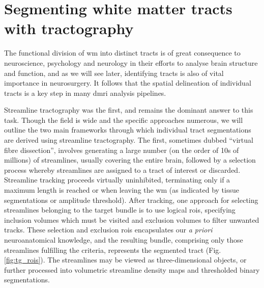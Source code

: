 \section{Segmenting white matter tracts with tractography}

The functional division of \gls{wm} into distinct tracts is of great consequence to neuroscience, psychology and neurology in their efforts to analyse brain structure and function, and as we will see later, identifying tracts is also of vital importance in neurosurgery.
It follows that the spatial delineation of individual tracts is a key step in many \gls{dmri} analysis pipelines.

Streamline tractography was the first, and remains the dominant answer to this task.
Though the field is wide and the specific approaches numerous, we will outline the two main frameworks through which individual tract segmentations are derived using streamline tractography.
The first, sometimes dubbed ``virtual fibre dissection'', involves generating a large number (on the order of 10s of millions) of streamlines, usually covering the entire brain, followed by a selection process whereby streamlines are assigned to a tract of interest or discarded.
Streamline tracking proceeds virtually uninhibited, terminating only if a maximum length is reached or when leaving the \gls{wm} (as indicated by tissue segmentations\autocite{Smith2012} or  amplitude threshold).
After tracking, one approach for selecting streamlines belonging to the target bundle is to use logical \glspl{roi}, specifying inclusion volumes which must be visited and exclusion volumes to filter unwanted tracks.
These selection and exclusion \glspl{roi} encapsulates our \textit{a priori} neuroanatomical knowledge, and the resulting bundle, comprising only those streamlines fulfilling the criteria, represents the segmented tract (Fig. \ref{fig:tg_rois}).
The streamlines may be viewed as three-dimensional objects, or further processed into volumetric streamline density maps\autocite{Calamante2010} and thresholded binary segmentations.

